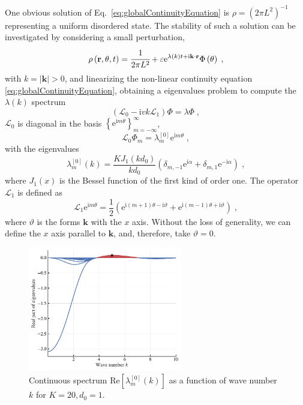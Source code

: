 \documentclass{article}
\begin{document}
One obvious solution of Eq.~\eqref{eq:globalContinuityEquation} is $\rho=(2\pi L^2)^{-1}$ representing a uniform disordered state. The stability of such a solution can be investigated by considering a small perturbation,
\begin{eqnarray}
    \rho \left( \mathbf{r},\theta ,t \right) =\cfrac{1}{2\pi L^2}+\varepsilon \mathrm{e}^{\lambda \left( k \right) t+\mathrm{i}\mathbf{k}\cdot \mathbf{r}}\Phi \left( \theta \right) \;,
\end{eqnarray}
with $k=\left| \mathbf{k} \right|>0$, and linearizing the non-linear continuity equation \eqref{eq:globalContinuityEquation}, obtaining a eigenvalues problem to compute the $\lambda(k)$ spectrum
\begin{equation}
    \left( \mathcal{L} _0-\mathrm{i}vk\mathcal{L} _1 \right) \Phi =\lambda \Phi \;,
\end{equation}
$\mathcal{L}_0$ is diagonal in the basis $\left\{ \mathrm{e}^{\mathrm{i}m\theta} \right\} _{m=-\infty}^{\infty}$,
\begin{equation}
    \mathcal{L} _0\Phi _m=\lambda _{m}^{\left[ 0 \right]}\mathrm{e}^{\mathrm{i}m\theta}\;,
\end{equation}
with the eigenvalues
\begin{equation}
    \lambda _{m}^{\left[ 0 \right]}\left( k \right) =\frac{KJ_1\left( kd_0 \right)}{kd_0}\left( \delta _{m,-1}\mathrm{e}^{\mathrm{i}\alpha}+\delta _{m,1}\mathrm{e}^{-\mathrm{i}\alpha} \right)  \;,
\end{equation}
where $J_1\left( x \right)$ is the Bessel function of the first kind of order one. The operator $\mathcal{L}_1$ is defined as
\begin{equation}
    \mathcal{L} _1\mathrm{e}^{\mathrm{i}m\theta}=\frac{1}{2}\left( \mathrm{e}^{\mathrm{i}\left( m+1 \right) \theta -\mathrm{i}\vartheta}+\mathrm{e}^{\mathrm{i}\left( m-1 \right) \theta +\mathrm{i}\vartheta} \right)  \;,
\end{equation}
where $\vartheta$ is the forms $\mathbf{k}$ with the $x$ axis. Without the loss of generality, we can define the $x$ axis parallel to $\mathbf{k}$, and, therefore, take $\vartheta = 0$.

\begin{figure}[H]
    \centering
    \includegraphics[width=0.6\textwidth]{./figs/continuous_spectrum.pdf}
    \caption{
        Continuous spectrum $\mathrm{Re}[ \lambda _{m}^{\left[ 0 \right]}\left( k \right) ]$ as a function of wave number $k$ for $K=20, d_0=1$.
    }
\end{figure}
\end{document}
